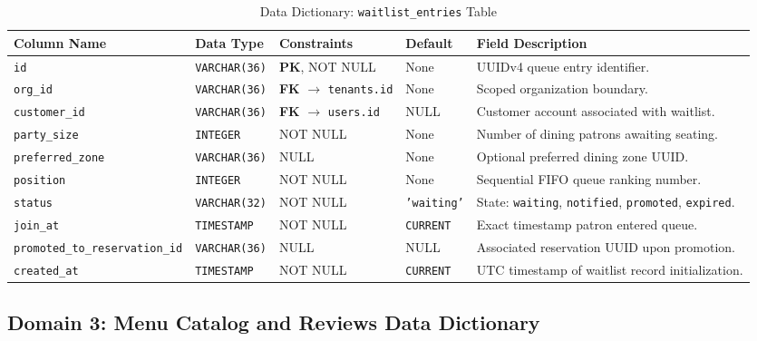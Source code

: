 \begin{table}[htbp]
\centering
\caption{Data Dictionary: \texttt{waitlist\_entries} Table}
\label{tab:dict_waitlist}
\small
\begin{tabularx}{\textwidth}{llp{3.2cm}lX}
\toprule
\textbf{Column Name} & \textbf{Data Type} & \textbf{Constraints} & \textbf{Default} & \textbf{Field Description} \\
\midrule
\texttt{id} & \texttt{VARCHAR(36)} & \textbf{PK}, NOT NULL & None & UUIDv4 queue entry identifier. \\
\texttt{org\_id} & \texttt{VARCHAR(36)} & \textbf{FK} $\to$ \texttt{tenants.id} & None & Scoped organization boundary. \\
\texttt{customer\_id}& \texttt{VARCHAR(36)}& \textbf{FK} $\to$ \texttt{users.id} & NULL & Customer account associated with waitlist. \\
\texttt{party\_size} & \texttt{INTEGER} & NOT NULL & None & Number of dining patrons awaiting seating. \\
\texttt{preferred\_zone}& \texttt{VARCHAR(36)}& NULL & None & Optional preferred dining zone UUID. \\
\texttt{position} & \texttt{INTEGER} & NOT NULL & None & Sequential FIFO queue ranking number. \\
\texttt{status} & \texttt{VARCHAR(32)} & NOT NULL & \texttt{'waiting'} & State: \texttt{waiting}, \texttt{notified}, \texttt{promoted}, \texttt{expired}. \\
\texttt{join\_at} & \texttt{TIMESTAMP} & NOT NULL & \texttt{CURRENT} & Exact timestamp patron entered queue. \\
\texttt{promoted\_to\_reservation\_id} & \texttt{VARCHAR(36)} & NULL & NULL & Associated reservation UUID upon promotion. \\
\texttt{created\_at} & \texttt{TIMESTAMP} & NOT NULL & \texttt{CURRENT} & UTC timestamp of waitlist record initialization. \\
\bottomrule
\end{tabularx}
\end{table}

\subsection{Domain 3: Menu Catalog and Reviews Data Dictionary}

